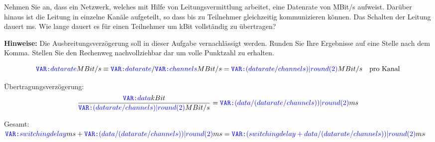 \question[5]

Nehmen Sie an, dass ein Netzwerk, welches mit Hilfe von Leitungsvermittlung
arbeitet, eine Datenrate von  MBit/s aufweist. Darüber hinaus ist die
Leitung in  einzelne Kanäle aufgeteilt, so dass bis zu 
Teilnehmer gleichzeitig kommunizieren können.  Das Schalten der Leitung dauert
 ms. Wie lange dauert es für einen Teilnehmer um  kBit
vollständig zu übertragen?

\textbf{Hinweise:} Die Ausbreitungsverzögerung soll in dieser Aufgabe vernachlässigt werden. Runden Sie Ihre Ergebnisse auf eine Stelle nach dem Komma. Stellen Sie den
Rechenweg nachvollziehbar dar um volle Punktzahl zu erhalten.

\begin{solutionbox}{5cm}
	\[
		\VAR{datarate} MBit/s \equiv \VAR{datarate}/\VAR{channels} MBit/s = \VAR{(datarate / channels)|round(2)} MBit/s \quad\textrm{pro Kanal}
	\]

	Übertragungsverzögerung:
	\[ \frac{\VAR{data} kBit}{\VAR{(datarate / channels)|round(2)} MBit/s} = \VAR{(data / (datarate / channels))|round(2)} ms\]

	Gesamt: $\VAR{switchingdelay} ms + \VAR{(data / (datarate / channels))|round(2)} ms = \VAR{(switchingdelay + data / (datarate / channels))|round(2)} ms$
\end{solutionbox}
